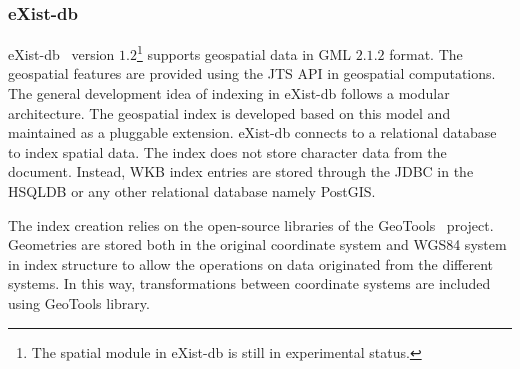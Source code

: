 \documentclass[a4paper,12pt]{article}
\begin{document}
\subsubsection{eXist-db}

eXist-db~\cite{existdb} version $1.2$\footnote{The spatial module in eXist-db is still in experimental status.} supports geospatial data in GML $2.1.2$ format. The geospatial features are provided using the JTS API in geospatial computations. 
The general development idea of indexing in eXist-db follows a modular architecture.
The geospatial index is developed based on this model and maintained as a pluggable extension. 
eXist-db connects to a relational database to index spatial data. The index does not store character data from the document. Instead, WKB index entries are stored through the JDBC in the HSQLDB or any other relational database namely PostGIS. 

The index creation relies on the open-source libraries of the GeoTools~\cite{geotools} project. Geometries are stored both in the original coordinate system and WGS84 system in index structure to allow the operations on data originated from the different systems. In this way, transformations between coordinate systems are included using GeoTools library.
 
\end{document}
